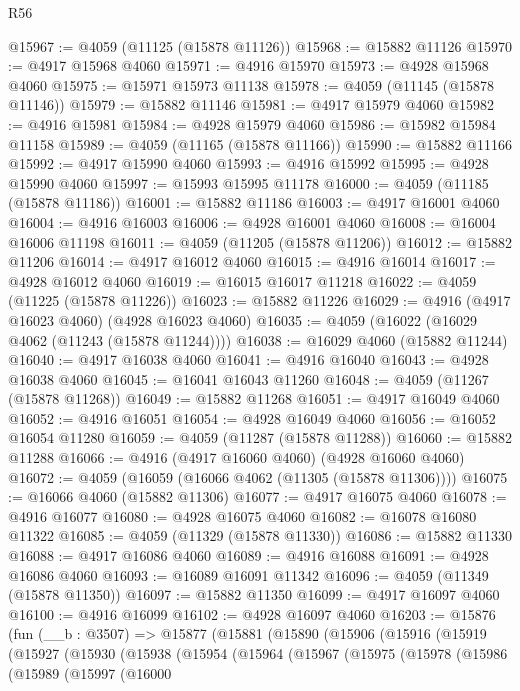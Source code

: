 \begin{lexlean}{R56}
\begin{coremodule}
@15967 := @4059 (@11125 (@15878 @11126))
@15968 := @15882 @11126
@15970 := @4917 @15968 @4060
@15971 := @4916 @15970
@15973 := @4928 @15968 @4060
@15975 := @15971 @15973 @11138
@15978 := @4059 (@11145 (@15878 @11146))
@15979 := @15882 @11146
@15981 := @4917 @15979 @4060
@15982 := @4916 @15981
@15984 := @4928 @15979 @4060
@15986 := @15982 @15984 @11158
@15989 := @4059 (@11165 (@15878 @11166))
@15990 := @15882 @11166
@15992 := @4917 @15990 @4060
@15993 := @4916 @15992
@15995 := @4928 @15990 @4060
@15997 := @15993 @15995 @11178
@16000 := @4059 (@11185 (@15878 @11186))
@16001 := @15882 @11186
@16003 := @4917 @16001 @4060
@16004 := @4916 @16003
@16006 := @4928 @16001 @4060
@16008 := @16004 @16006 @11198
@16011 := @4059 (@11205 (@15878 @11206))
@16012 := @15882 @11206
@16014 := @4917 @16012 @4060
@16015 := @4916 @16014
@16017 := @4928 @16012 @4060
@16019 := @16015 @16017 @11218
@16022 := @4059 (@11225 (@15878 @11226))
@16023 := @15882 @11226
@16029 := @4916 (@4917 @16023 @4060) (@4928 @16023 @4060)
@16035 := @4059 (@16022 (@16029 @4062 (@11243 (@15878 @11244))))
@16038 := @16029 @4060 (@15882 @11244)
@16040 := @4917 @16038 @4060
@16041 := @4916 @16040
@16043 := @4928 @16038 @4060
@16045 := @16041 @16043 @11260
@16048 := @4059 (@11267 (@15878 @11268))
@16049 := @15882 @11268
@16051 := @4917 @16049 @4060
@16052 := @4916 @16051
@16054 := @4928 @16049 @4060
@16056 := @16052 @16054 @11280
@16059 := @4059 (@11287 (@15878 @11288))
@16060 := @15882 @11288
@16066 := @4916 (@4917 @16060 @4060) (@4928 @16060 @4060)
@16072 := @4059 (@16059 (@16066 @4062 (@11305 (@15878 @11306))))
@16075 := @16066 @4060 (@15882 @11306)
@16077 := @4917 @16075 @4060
@16078 := @4916 @16077
@16080 := @4928 @16075 @4060
@16082 := @16078 @16080 @11322
@16085 := @4059 (@11329 (@15878 @11330))
@16086 := @15882 @11330
@16088 := @4917 @16086 @4060
@16089 := @4916 @16088
@16091 := @4928 @16086 @4060
@16093 := @16089 @16091 @11342
@16096 := @4059 (@11349 (@15878 @11350))
@16097 := @15882 @11350
@16099 := @4917 @16097 @4060
@16100 := @4916 @16099
@16102 := @4928 @16097 @4060
@16203 := @15876
    (fun (__b : @3507) =>
    @15877
      (@15881
        (@15890
          (@15906
            (@15916
              (@15919
                (@15927
                  (@15930
                    (@15938
                      (@15954
                        (@15964
                          (@15967
                            (@15975
                              (@15978
                                (@15986
                                  (@15989
                                    (@15997
                                      (@16000

\end{coremodule}
\end{lexlean}
